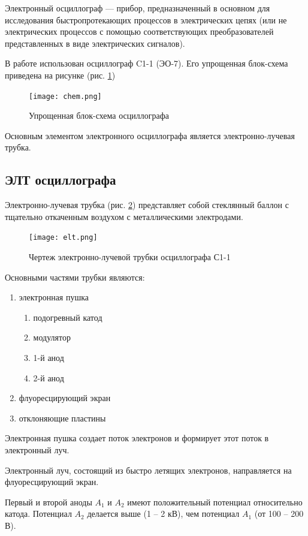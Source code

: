 Электронный осциллограф — прибор, предназначенный в основном для исследования быстропротекающих процессов в электрических цепях (или не электрических процессов с помощью соответствующих преобразователей представленных в виде электрических сигналов).

В работе использован осциллограф C1-1 (ЭО-7). Его упрощенная блок-схема приведена на рисунке (рис. \ref{fig:chem})

\begin{figure}[H]
	\centering
	\texttt{[image: chem.png]}
	\caption{Упрощенная блок-схема осциллографа}
	\label{fig:chem}
\end{figure}

Основным элементом электронного осциллографа является электронно-лучевая трубка.

\subsection{ЭЛТ осциллографа}

Электронно-лучевая трубка (рис. \ref{fig:elt}) представляет собой стеклянный баллон с тщательно откаченным воздухом с металлическими электродами.

\begin{figure}[H]
	\centering
	\texttt{[image: elt.png]}
	\caption{Чертеж электронно-лучевой трубки осциллографа С1-1}
	\label{fig:elt}
\end{figure}

Основными частями трубки являются:
\begin{enumerate}
	\item электронная пушка
		\begin{enumerate}
			\item подогревный катод
			\item модулятор
			\item 1-й анод
			\item 2-й анод
		\end{enumerate}
	\item флуоресцирующий экран
	\item отклоняющие пластины
\end{enumerate}

Электронная пушка создает поток электронов и формирует этот поток в электронный луч.

Электронный луч, состоящий из быстро летящих электронов, направляется на флуоресцирующий экран.

Первый и второй аноды $A_1$ и $A_2$ имеют положительный потенциал относительно катода. Потенциал $A_2$ делается выше (1 -- 2 кВ), чем потенциал $A_1$ (от 100 -- 200 В). 

